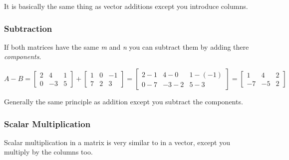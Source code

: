 \documentclass[12pt]{report}
\begin{document}
                It is basically the same thing as vector additions except you introduce columns.
                
            \subsubsection{Subtraction}
                If both matrices have the same \emph{m} and \emph{n} you can subtract them by adding there \emph{components}.

                \begin{equation}
                A - B =
                    \begin{bmatrix} 2 & 4 & 1 \\ 0 & -3 & 5 \end{bmatrix} +
                    \begin{bmatrix} 1 & 0 & -1 \\ 7 & 2 & 3 \end{bmatrix} =
                    \begin{bmatrix} 2 - 1 & 4 - 0 & 1 - (-1) \\ 0 - 7 & -3 - 2 & 5 - 3 \end{bmatrix} =
                    \begin{bmatrix} 1 & 4 & 2 \\ -7 & -5 & 2 \end{bmatrix}
                \end{equation}

                Generally the same principle as addition except you subtract the components.
            \subsubsection{}

            \subsubsection{Scalar Multiplication}
                Scalar multiplication in a matrix is very similar to in a vector, except you multiply by the columns too.
                
\end{document}
